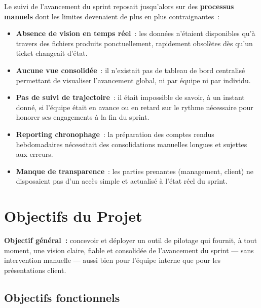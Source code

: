\documentclass[12pt, a4paper]{article}
\begin{document}
\begin{orangebox}
Le suivi de l'avancement du sprint reposait jusqu'alors sur des
\textbf{processus manuels} dont les limites devenaient de plus en plus
contraignantes~:

\begin{itemize}[leftmargin=1.5em, itemsep=3pt]
  \item \textbf{Absence de vision en temps réel}~: les données n'étaient
        disponibles qu'à travers des fichiers produits ponctuellement, rapidement
        obsolètes dès qu'un ticket changeait d'état.
  \item \textbf{Aucune vue consolidée}~: il n'existait pas de tableau de bord
        centralisé permettant de visualiser l'avancement global, ni par équipe
        ni par individu.
  \item \textbf{Pas de suivi de trajectoire}~: il était impossible de savoir,
        à un instant donné, si l'équipe était en avance ou en retard sur le
        rythme nécessaire pour honorer ses engagements à la fin du sprint.
  \item \textbf{Reporting chronophage}~: la préparation des comptes rendus
        hebdomadaires nécessitait des consolidations manuelles longues et
        sujettes aux erreurs.
  \item \textbf{Manque de transparence}~: les parties prenantes (management,
        client) ne disposaient pas d'un accès simple et actualisé à l'état
        réel du sprint.
\end{itemize}
\end{orangebox}

\vspace{0.4cm}

\section{Objectifs du Projet}

\begin{purplebox}
\textbf{Objectif général~:} concevoir et déployer un outil de pilotage qui
fournit, à tout moment, une vision claire, fiable et consolidée de l'avancement
du sprint — sans intervention manuelle — aussi bien pour l'équipe interne que
pour les présentations client.
\end{purplebox}

\vspace{0.4cm}

\subsection{Objectifs fonctionnels}
\end{document}
